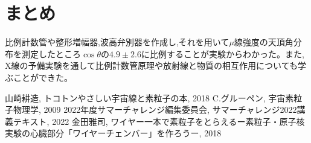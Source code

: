 \documentclass[a4j]{jsarticle}
\begin{document}
\section{まとめ}
比例計数管や整形増幅器,波高弁別器を作成し,それを用いて$\mu$線強度の天頂角分布を測定したところ$\cos\theta$の$4.9 \pm 2.6$に比例することが実験からわかった。また, X線の予備実験を通して比例計数管原理や放射線と物質の相互作用についても学ぶことができた。

\begin{thebibliography}{99}
 山崎耕造, トコトンやさしい宇宙線と素粒子の本, 2018
 C.グルーペン, 宇宙素粒子物理学, 2009
 2022年度サマーチャレンジ編集委員会, サマーチャレンジ2022講義テキスト, 2022
 金田雅司, ワイヤー一本で素粒子をとらえるー素粒子・原子核実験の心臓部分「ワイヤーチェンバー」を作ろうー, 2018
\end{thebibliography}
\end{document}
